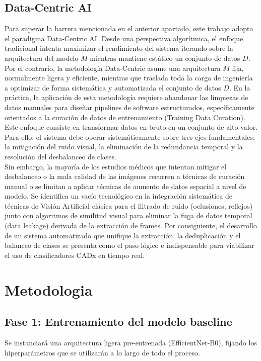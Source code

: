 ﻿\documentclass[10pt,a4paper,twocolumn,twoside]{article}
\begin{document}
\subsection{Data-Centric AI\@}
Para superar la barrera mencionada en el anterior apartado, este trabajo adopta el paradigma Data-Centric AI\cite{zha2025datacentric}. Desde una perspectiva algorítmica, el enfoque tradicional intenta maximizar el rendimiento del sistema iterando sobre la arquitectura del modelo $M$ mientras mantiene estático un conjunto de datos $D$. Por el contrario, la metodología Data-Centric asume una arquitectura $M$ fija, normalmente ligera y eficiente, mientras que traslada toda la carga de ingeniería a optimizar de forma sistemática y automatizada el conjunto de datos $D$. En la práctica, la aplicación de esta metodología requiere abandonar las limpiezas de datos manuales para diseñar pipelines de software estructurados, específicamente orientados a la curación de datos de entrenamiento (Training Data Curation). Este enfoque consiste en transformar datos en bruto en un conjunto de alto valor. Para ello, el sistema debe operar sistemáticamente sobre tres ejes fundamentales: la mitigación del ruido visual, la eliminación de la redundancia temporal y la resolución del desbalanceo de clases.\\
Sin embargo, la mayoría de los estudios médicos que intentan mitigar el desbalanceo o la mala calidad de las imágenes recurren a técnicas de curación manual o se limitan a aplicar técnicas de aumento de datos espacial a nivel de modelo. Se identifica un vacío tecnológico en la integración sistemática de técnicas de Visión Artificial clásica para el filtrado de ruido (oclusiones, reflejos) junto con algoritmos de similitud visual para eliminar la fuga de datos temporal (data leakage) derivada de la extracción de frames. Por consiguiente, el desarrollo de un sistema automatizado que unifique la extracción, la deduplicación y el balanceo de clases se presenta como el paso lógico e indispensable para viabilizar el uso de clasificadores CADx en tiempo real.

\section{Metodologia}
\subsection{Fase 1: Entrenamiento del modelo baseline}
Se instanciará una arquitectura ligera pre-entrenada (EfficientNet-B0), fijando los hiperparámetros que se utilizarán a lo largo de todo el proceso.
\end{document}
